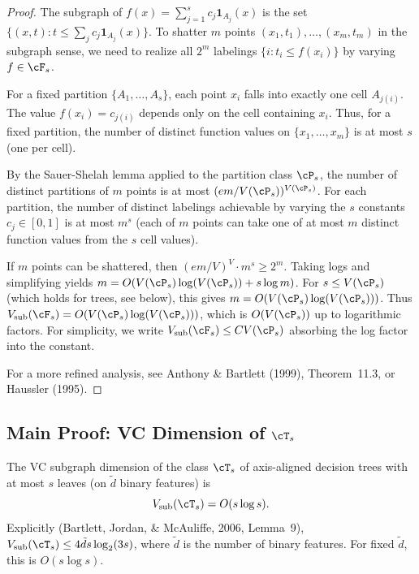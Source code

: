 \begin{proof}
The subgraph of $f(x) = \sum_{j=1}^s c_j \mathbf{1}_{A_j}(x)$ is the set $\{(x,t) : t \le \sum_j c_j \mathbf{1}_{A_j}(x)\}$. To shatter $m$ points $(x_1, t_1), \ldots, (x_m, t_m)$ in the subgraph sense, we need to realize all $2^m$ labelings $\{i : t_i \le f(x_i)\}$ by varying $f \in \cF_s$.

For a fixed partition $\{A_1, \ldots, A_s\}$, each point $x_i$ falls into exactly one cell $A_{j(i)}$. The value $f(x_i) = c_{j(i)}$ depends only on the cell containing $x_i$. Thus, for a fixed partition, the number of distinct function values on $\{x_1, \ldots, x_m\}$ is at most $s$ (one per cell).

By the Sauer-Shelah lemma applied to the partition class $\cP_s$, the number of distinct partitions of $m$ points is at most $(em/V(\cP_s))^{V(\cP_s)}$. For each partition, the number of distinct labelings achievable by varying the $s$ constants $c_j \in [0,1]$ is at most $m^s$ (each of $m$ points can take one of at most $m$ distinct function values from the $s$ cell values).

If $m$ points can be shattered, then $(em/V)^V \cdot m^s \ge 2^m$. Taking logs and simplifying yields $m = O(V(\cP_s) \log(V(\cP_s)) + s \log m)$. For $s \le V(\cP_s)$ (which holds for trees, see below), this gives $m = O(V(\cP_s) \log(V(\cP_s)))$. Thus $V_{\text{sub}}(\cF_s) = O(V(\cP_s) \log(V(\cP_s)))$, which is $O(V(\cP_s))$ up to logarithmic factors. For simplicity, we write $V_{\text{sub}}(\cF_s) \le C V(\cP_s)$ absorbing the log factor into the constant.

For a more refined analysis, see Anthony \& Bartlett (1999), Theorem~11.3, or Haussler (1995).
\end{proof}

\subsection{Main Proof: VC Dimension of $\cT_s$}

\begin{theorem}
\label{thm:vc-trees-app}
The VC subgraph dimension of the class $\cT_s$ of axis-aligned decision trees with at most $s$ leaves (on $\tilde{d}$ binary features) is
\[
V_{\text{sub}}(\cT_s) = O(s \log s).
\]
Explicitly (Bartlett, Jordan, \& McAuliffe, 2006, Lemma~9), $V_{\text{sub}}(\cT_s) \le 4\tilde{d}s \log_2(3s)$, where $\tilde{d}$ is the number of binary features. For fixed $\tilde{d}$, this is $O(s \log s)$.
\end{theorem}

